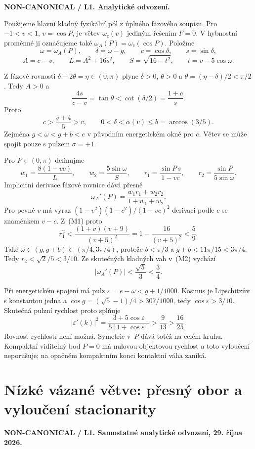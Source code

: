 \documentclass[11pt,a4paper]{article}
\theoremstyle{remark}\newtheorem{remark}[theorem]{Poznámka}
\numberwithin{equation}{section}
\begin{document}
\textbf{NON-CANONICAL / L1. Analytické odvození.}

Použijeme hlavní kladný fyzikální pól z úplného fázového soupisu.
Pro \(-1<v<1\), \(v=\cos P\), je větev \(\omega_c(v)\)
jediným řešením \(F=0\). V hybnostní proměnné ji označujeme také
\(\omega_A(P)=\omega_c(\cos P)\). Položme
\[
\omega=\omega_A(P),\qquad
\delta=\omega-g,\qquad c=\cos\delta,\qquad s=\sin\delta,
\]
\[
A=c-v,\qquad L=A^2+16s^2,\qquad
S=\sqrt{16-t^2},\qquad t=v-5\cos\omega.
\]

Z fázové rovnosti \(\delta+2\theta=\eta\in(0,\pi)\) plyne
\(\delta>0\), \(\theta>0\) a
\(\theta=(\eta-\delta)/2<\pi/2\). Tedy \(A>0\) a
\[
\frac{4s}{c-v}=\tan\theta<\cot(\delta/2)=\frac{1+c}{s}.
\]
Proto
\[
\boxed{c>\frac{v+4}{5}>v,\qquad
0<\delta<\alpha(v)\le b=\arccos(3/5).}
\tag{M1}
\]
Zejména \(g<\omega<g+b<e\) v původním energetickém okně pro
\(e\). Větev se může spojit pouze s pulzem \(\sigma=+1\).

Pro \(P\in(0,\pi)\) definujme
\[
w_1=\frac{8(1-vc)}L,\qquad w_2=\frac{5\sin\omega}S,
\qquad r_1=\frac{\sin P\,s}{1-vc},\qquad
r_2=\frac{\sin P}{5\sin\omega}.
\]
Implicitní derivace fázové rovnice dává přesně
\[
\omega_A'(P)=\frac{w_1r_1+w_2r_2}{1+w_1+w_2}.
\tag{M2}
\]
Pro pevné \(v\) má výraz
\((1-v^2)(1-c^2)/(1-vc)^2\) derivaci podle \(c\) se znaménkem
\(v-c\). Z~(M1) proto
\[
r_1^2<\frac{(1+v)(v+9)}{(v+5)^2}
=1-\frac{16}{(v+5)^2}<\frac59.
\]
Také \(\omega\in(g,g+b)\subset(\pi/4,3\pi/4)\), protože
\(b<\pi/3\) a \(g+b<11\pi/15<3\pi/4\). Tedy
\(r_2<\sqrt2/5<3/10\). Ze skutečných kladných vah v~(M2)
vychází
\[
\boxed{|\omega_A'(P)|<\frac{\sqrt5}{3}<\frac34.}
\tag{M3}
\]

Při energetickém spojení má pulz
\(\varepsilon=e-\omega<g+1/1000\). Kosinus je Lipschitzův
s konstantou jedna a \(\cos g=(\sqrt5-1)/4>307/1000\), tedy
\(\cos\varepsilon>3/10\). Skutečná pulzní rychlost proto
splňuje
\[
|\varepsilon'(k)|^2
=\frac{3+5\cos\varepsilon}{5[1+\cos\varepsilon]}
>\frac9{13}>\frac{16}{25}.
\tag{M4}
\]
Rovnost rychlostí není možná. Symetrie v~\(P\) dává totéž na
celém kruhu. Kompaktní viditelný bod \(P=0\) má nulovou
objektovou rychlost a toto vyloučení neporušuje; na opačném
kompaktním konci kontaktní váha zaniká.

\section{Nízké vázané větve: přesný obor a vyloučení stacionarity}

\textbf{NON-CANONICAL / L1. Samostatné analytické odvození,
29. října 2026.}
\end{document}
